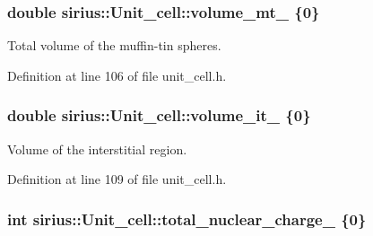 \hypertarget{classsirius_1_1_unit__cell_abc60aef6ddce77ee141f793d241a7954}{}
\subsubsection[{volume\+\_\+mt\+\_\+}]{\setlength{\rightskip}{0pt plus 5cm}double sirius\+::\+Unit\+\_\+cell\+::volume\+\_\+mt\+\_\+ \{0\}\hspace{0.3cm}{\ttfamily [private]}}\label{classsirius_1_1_unit__cell_abc60aef6ddce77ee141f793d241a7954}


Total volume of the muffin-\/tin spheres. 



Definition at line 106 of file unit\+\_\+cell.\+h.

\hypertarget{classsirius_1_1_unit__cell_ad9356b5d033e2cf0d02cc31d78db3561}{}
\subsubsection[{volume\+\_\+it\+\_\+}]{\setlength{\rightskip}{0pt plus 5cm}double sirius\+::\+Unit\+\_\+cell\+::volume\+\_\+it\+\_\+ \{0\}\hspace{0.3cm}{\ttfamily [private]}}\label{classsirius_1_1_unit__cell_ad9356b5d033e2cf0d02cc31d78db3561}


Volume of the interstitial region. 



Definition at line 109 of file unit\+\_\+cell.\+h.

\hypertarget{classsirius_1_1_unit__cell_a72e8437b162d6e934e2e7763d9f76e11}{}
\subsubsection[{total\+\_\+nuclear\+\_\+charge\+\_\+}]{\setlength{\rightskip}{0pt plus 5cm}int sirius\+::\+Unit\+\_\+cell\+::total\+\_\+nuclear\+\_\+charge\+\_\+ \{0\}\hspace{0.3cm}{\ttfamily [private]}}\label{classsirius_1_1_unit__cell_a72e8437b162d6e934e2e7763d9f76e11}


